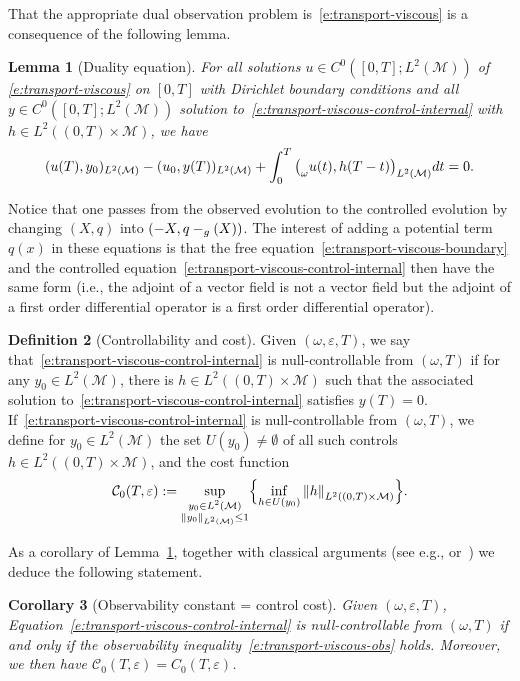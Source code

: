 \documentclass[11pt]{article}
\makeatletter
\newcommand{\ie}{i.e.,\xspace}
\newcommand{\eg}{e.g.,\xspace}
\numberwithin{equation}{section}
\DeclareRobustCommand{\mathds}[1]{\csname jepbb@#1\endcsname}
\newtheorem{lemma}{Lemma}[section]
\newtheorem{corollary}[lemma]{Corollary}
\theoremstyle{definition}
\newtheorem{definition}[lemma]{Definition}
\newcommand{\M}{\ensuremath{\mathcal M}}
\let \div \relax
\DeclareMathOperator{\div}{div}
\newcommand\nor[2]{\left\|#1\right\|_{#2}}
\let\eps\varepsilon
\makeatother
\begin{document}
That the appropriate dual observation problem is~\eqref{e:transport-viscous} is a consequence of the following lemma.
\begin{lemma}[Duality equation]
\label{l:duality-equation-1}
For all solutions $u \in C^0([0,T]; L^2(\M))$ of \eqref{e:transport-viscous} on $[0,T]$ with Dirichlet boundary conditions and all $y\in C^0([0,T]; L^2(\M))$ solution to~\eqref{e:transport-viscous-control-internal} with $h \in L^2((0,T)\times \M)$, we have
\begin{equation}
\label{e:duality-equation-1}
(u(T), y_0)_{L^2(\M)} - (u_0, y(T))_{L^2(\M)} +\int_0^T\big(\mathds{1}_\omega u(t), h(T-t) \big)_{L^2(\M)} dt =0.
\end{equation}
\end{lemma}

Notice that one passes from the observed evolution to the controlled evolution by changing $(X, q)$ into $(-X, q-\div_{g}(X))$. The interest of adding a potential term $q(x)$ in these equations is that the free equation~\eqref{e:transport-viscous-boundary} and the controlled equation~\eqref{e:transport-viscous-control-internal} then have the same form (\ie the adjoint of a vector field is not a vector field but the adjoint of a first order differential operator is a first order differential operator).

\begin{definition}[Controllability and cost]
Given $(\omega, \eps, T)$, we say that~\eqref{e:transport-viscous-control-internal} is null-controllable from $(\omega, T)$ if for any $y_0 \in L^2(\M)$, there is $h \in L^2((0,T)\times \M)$ such that the associated solution to~\eqref{e:transport-viscous-control-internal} satisfies $y(T) =0$.
If~\eqref{e:transport-viscous-control-internal} is null-controllable from $(\omega, T)$, we define for $y_0 \in L^2(\M)$ the set $U(y_0) \neq \emptyset$ of all such controls $h \in L^2((0,T)\times \M)$, and the cost function
\[
\mathcal{C}_0(T,\eps) := \sup_{\substack{y_0 \in L^2(\M)\\ \nor{y_0}{L^2(\M)}\leq 1}} \Bigl\{\inf_{h \in U(y_0)} \nor{h}{L^2((0,T)\times \M)} \Bigr\}.
\]
\end{definition}
As a corollary of Lemma~\ref{l:duality-equation-1}, together with classical arguments (see \eg \cite{DR:77} or~\cite[Chap.\,2.3]{Cor:book}) we deduce the following statement.
\begin{corollary}[Observability constant = control cost]
\label{c:obscontrol}
Given $(\omega, \eps, T)$, Equation~\eqref{e:transport-viscous-control-internal} is null-controllable from $(\omega, T)$ if and only if the observability inequality~\eqref{e:transport-viscous-obs} holds.
Moreover, we then have $\mathcal{C}_0(T,\eps)= C_0(T,\eps)$.
\end{corollary}
\end{document}
